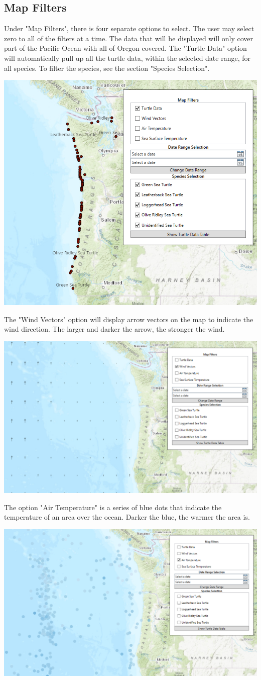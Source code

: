 \documentclass[onecolumn, draftclsnofoot,10pt, compsoc]{IEEEtran}
\begin{document}
\subsection{Map Filters}
Under "Map Filters", there is four separate options to select. The user may select zero to all of the filters at a time. The data that will be displayed will only cover part of the Pacific Ocean with all of Oregon covered. 
\newline The "Turtle Data" option will automatically pull up all the turtle data, within the selected date range, for all species. To filter the species, see the section "Species Selection". 
\newline \begin{center}\includegraphics[width=0.5 \textwidth]{images/turtle-data.PNG}\end{center}
The "Wind Vectors" option will display arrow vectors on the map to indicate the wind direction. The larger and darker the arrow, the stronger the wind. 
\newline \begin{center}\includegraphics[width=0.5 \textwidth]{images/wind-vector.PNG}\end{center}
The option "Air Temperature" is a series of blue dots that indicate the temperature of an area over the ocean. Darker the blue, the warmer the area is. 
\newline \begin{center}\includegraphics[width=0.5 \textwidth]{images/air-temp.PNG}\end{center}
\end{document}
